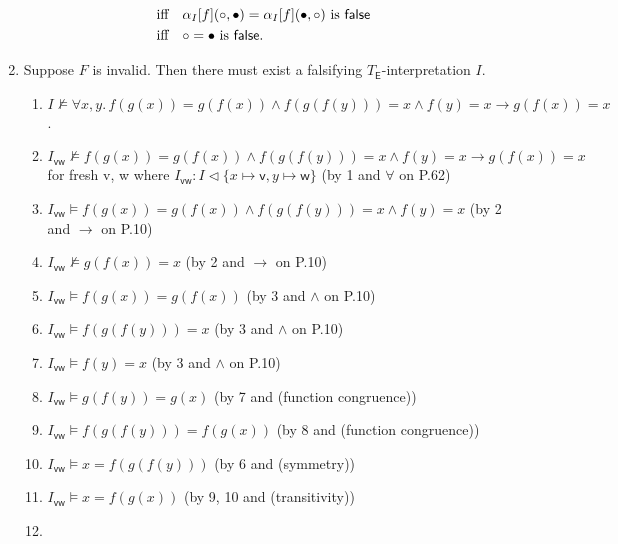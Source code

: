 \begin{exer}[3.1]
\begin{enumerate}[label=(\alph*)]
\begin{align*}
                &\text{iff}\quad \alpha_{I}[f](\circ, \bullet) = \alpha_{I}[f](\bullet, \circ) \text{ is \textsf{false}}\\
                &\text{iff}\quad \circ = \bullet \text{ is \textsf{false}}.
            \end{align*}
        \item
            Suppose $F$ is invalid. Then there must exist a falsifying $T_{\textsf{E}}$-interpretation $I$.
            \begin{enumerate}[label=\arabic*.]
                \item %
                    $I \not\models \forall x, y.\, f(g(x)) = g(f(x)) \land f(g(f(y))) = x \land f(y) = x \rightarrow g(f(x)) = x$.
                \item %
                    $I_{\textsf{vw}} \not\models f(g(x)) = g(f(x)) \land f(g(f(y))) = x \land f(y) = x \rightarrow g(f(x)) = x$ for fresh \textsf{v, w} where $I_{\textsf{vw}}: I \vartriangleleft \{ x \mapsto \textsf{v}, y \mapsto \textsf{w} \}$ (by 1 and $\forall$ on P.62)
                \item %
                    $I_{\textsf{vw}} \models f(g(x)) = g(f(x)) \land f(g(f(y))) = x \land f(y) = x$ (by 2 and $\rightarrow$ on P.10)
                \item %
                    $I_{\textsf{vw}} \not\models g(f(x)) = x$ (by 2 and $\rightarrow$ on P.10)
                \item %
                    $I_{\textsf{vw}} \models f(g(x)) = g(f(x))$ (by 3 and $\land$ on P.10)
                \item %
                    $I_{\textsf{vw}} \models f(g(f(y))) = x$ (by 3 and $\land$ on P.10)
                \item %
                    $I_{\textsf{vw}} \models f(y) = x$ (by 3 and $\land$ on P.10)
                \item %
                    $I_{\textsf{vw}} \models g(f(y)) = g(x)$ (by 7 and \textsf{(function congruence)})
                \item %
                    $I_{\textsf{vw}} \models f(g(f(y))) = f(g(x))$ (by 8 and \textsf{(function congruence)})
                \item %
                    $I_{\textsf{vw}} \models x = f(g(f(y)))$ (by 6 and \textsf{(symmetry)})
                \item %
                    $I_{\textsf{vw}} \models x = f(g(x))$ (by 9, 10 and \textsf{(transitivity)})
                \item %

\end{enumerate}
\end{enumerate}
\end{exer}
